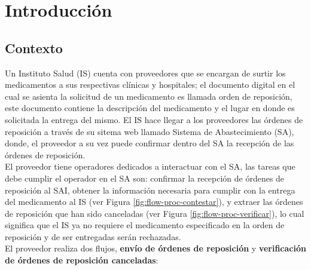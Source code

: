 \chapter{Introducción}\label{cap1}

\section{Contexto} \label{sec:intro-contexto}
Un Instituto Salud (IS) cuenta con proveedores que se encargan de surtir los medicamentos a sus respectivas clínicas y hospitales; el documento digital en el cual se asienta la solicitud de un medicamento es llamada orden de reposición, este documento contiene la descripción del medicamento y el lugar en donde es solicitada la entrega del mismo. El IS hace llegar a los proveedores las órdenes de reposición a través de su sitema web llamado Sistema de Abastecimiento (SA), donde, el proveedor a su vez puede confirmar dentro del SA la recepción de las órdenes de reposición.\\
El proveedor tiene operadores dedicados a interactuar con el SA, las tareas que debe cumplir el operador en el SA son: confirmar la recepción de órdenes de reposición al SAI, obtener la información necesaria para cumplir con la entrega del medicamento al IS (ver Figura \ref{fig:flow-proc-contestar}), y extraer las órdenes de reposición que han sido canceladas (ver Figura \ref{fig:flow-proc-verificar}), lo cual significa que el IS ya no requiere el medicamento especificado en la orden de reposición y de ser entregadas serán rechazadas.\\
El proveedor realiza dos flujos, \textbf{envío de órdenes de reposición} y \textbf{verificación de órdenes de reposición canceladas}:
